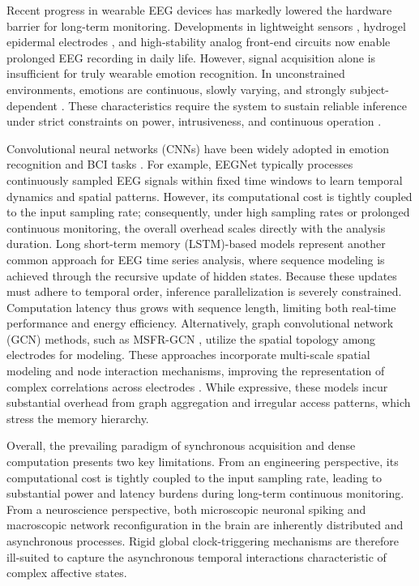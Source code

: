 \documentclass{nsr}
\begin{document}
Recent progress in wearable EEG devices has markedly lowered the hardware barrier for long-term monitoring. Developments in lightweight sensors \cite{ref9}, hydrogel epidermal electrodes \cite{ref10}, and high-stability analog front-end circuits \cite{ref11} now enable prolonged EEG recording in daily life. However, signal acquisition alone is insufficient for truly wearable emotion recognition. In unconstrained environments, emotions are continuous, slowly varying, and strongly subject-dependent \cite{ref12}. These characteristics require the system to sustain reliable inference under strict constraints on power, intrusiveness, and continuous operation \cite{ref13}.

Convolutional neural networks (CNNs) have been widely adopted in emotion recognition and BCI tasks \cite{ref18}. For example, EEGNet \cite{ref56} typically processes continuously sampled EEG signals within fixed time windows to learn temporal dynamics and spatial patterns. However, its computational cost is tightly coupled to the input sampling rate; consequently, under high sampling rates or prolonged continuous monitoring, the overall overhead scales directly with the analysis duration. Long short-term memory (LSTM)-based models \cite{ref20,ref21} represent another common approach for EEG time series analysis, where sequence modeling is achieved through the recursive update of hidden states. Because these updates must adhere to temporal order, inference parallelization is severely constrained. Computation latency thus grows with sequence length, limiting both real-time performance and energy efficiency. Alternatively, graph convolutional network (GCN) methods, such as MSFR-GCN \cite{ref22}, utilize the spatial topology among electrodes for modeling. These approaches incorporate multi-scale spatial modeling and node interaction mechanisms, improving the representation of complex correlations across electrodes \cite{ref23,ref24}. While expressive, these models incur substantial overhead from graph aggregation and irregular access patterns, which stress the memory hierarchy.

Overall, the prevailing paradigm of synchronous acquisition and dense computation presents two key limitations. From an engineering perspective, its computational cost is tightly coupled to the input sampling rate, leading to substantial power and latency burdens during long-term continuous monitoring. From a neuroscience perspective, both microscopic neuronal spiking and macroscopic network reconfiguration in the brain are inherently distributed and asynchronous processes. Rigid global clock-triggering mechanisms are therefore ill-suited to capture the asynchronous temporal interactions characteristic of complex affective states.
\end{document}
